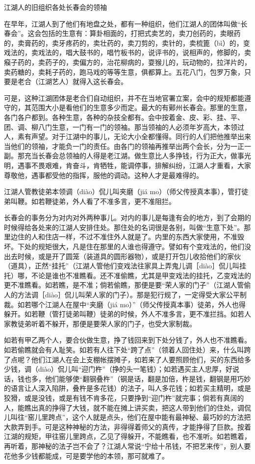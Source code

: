\documentclass[12pt,UTF8]{ctexbook}
\begin{document}
江湖人的旧组织各处长春会的领袖


在早年，江湖人到了他们有地盘之处，都有一种组织，他们江湖人的团体叫做“长春会”。这会包括的生意有：算卦相面的，打把式卖艺的，卖刀创药的，卖眼药的，卖膏药的，卖牙疼药的，卖壮药的，卖刀剪的，卖针的，卖梳篦（bì）的，变戏法的，卖戏法的，唱大鼓书的，唱竹板书的，说评书的，说相声的，修脚的，卖瘊子药的，卖药子的，卖偏方的，治花柳病的，耍猴儿的，玩动物的，拉洋片的，卖药糖的，卖耗子药的，跑马戏的等等生意，俱都算上。五花八门，包罗万象，只要是老合（江湖艺人）就得入这长春会。

可是，这种江湖团体是老合们自动组织，并不在当地官署立案，会中的规矩都能遵守的，其范围大小是看他们的生意多少而定。最大的有鄚州长春会。那里的生意，各门各户都到。各种生意，各种的杂技全都有。会中按着金、皮、彩、挂、平、团、调、柳八门生意，一门有一门的领袖。那当领袖的人必须年岁高大，本领过人，素有声望。对于江湖中的事儿，无论大小全都懂得。同行的人们把他推举出来当他们的领袖，才能负一门的责任。由各门的领袖再推举出两个会长，分为一正一副。那充当长春会总领袖的人得是老江湖。做生意比人多挣钱，行为正大，做事光明，遇事不畏艰难，肯奋斗，肯牺牲，能调停事，排解纠纷，江湖人才重看，大家尊敬他，遇事都受他的指挥，服他的调动。这种人才是最难得的。

江湖人管教徒弟本领调（diào）侃儿叫夹磨（jiá mo）（师父传授真本事），管打徒弟叫鞭。如若鞭徒弟，外人看了不准多言，更不准阻拦。



长春会的事务分为对内对外两种事儿。对内的事儿是每逢有会的地方，到了会期的时候得给各处来的江湖人安排住处。那住处的名词很是各别，叫做“生意下处”。那里边住的人和住店一样，不过不准住外人就是了。内里的东西大家使用，不准毁坏。下处的规矩很大，凡是住在那里的人谁也得遵守。譬如有个变戏法的，他们没出去时候，或是开了圆笼（装道具的圆形器物），或是打开包儿收拾他们的家伙（道具），正然“挂托”（江湖人管他们变戏法往家具上弄鬼儿调［diào］侃儿叫挂托）哪，不论是谁也不准瞧看。还不准偷瞧，尤其是甲变戏法的挂托，乙变戏法的更不准瞧看。如若瞧，是不准；倘若偷瞧，那便是要“荣人家的门子”（江湖人管偷人的方法调［diào］侃儿叫荣人家的门子）。那是犯行规了，一定得受大家公平制裁。如若哪个江湖人在屋中“夹磨（jiá mo）”（师父传授真本事）徒弟，外人也得躲开。如若鞭（管打徒弟叫鞭）徒弟的时候，外人不准多言，更不准拦挡。如若人家教徒弟听着不躲开，那便是要荣人家的门子，也受大家制裁。

如若有甲乙两个人，要合伙做生意，挣了钱回来到下处分钱了，外人也不准瞧看。如若偷瞧就会有人耻笑。如若有人往下处“跨了点”（领着人回住处）来，什么叫跨了点呢？他们江湖人在会上支棚帐摆摊子，如若来了人要照顾他们，买的东西给多少钱，调（diào）侃儿叫“迎门杵”（挣的头一笔钱）；如若遇买主人忠厚，好说话，钱也多，他们能够使“翻钢叠杵”（钢是话，翻是加倍，杵是钱，翻钢是用巧妙的语言让人深入陷阱，叠杵是多花钱）的法子，叫人多花钱；如若买主精明，或是狡猾，或是没钱，或是有钱不肯多花，只要挣到“迎门杵”就完事；倘若有真阔的人，能瞧出真的挣得了大钱，就不能在摊上讲买卖，把这人带到他们的住处，调侃儿叫往“窑儿里跨点”，这个人就是点头，他们在屋中能有最神秘、最巧妙的方法把大款弄到手。可是这种神秘的方法，非得得着师父的真传，才能挣得了巨款。按着江湖的规矩，甲往窑儿里跨点，乙见了得躲开，不能瞧看，也不准听。如若瞧着，再听着，那神秘的法子岂不会了？江湖人常说“宁给十吊钱，不把艺来传”，别人要花他多少钱都能成，可是要学他的本领，那可就难了。
\end{document}
